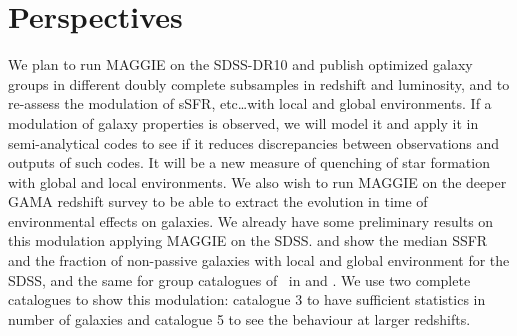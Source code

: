 \section{Perspectives}
\label{sec:perspectives}

We plan to run MAGGIE on the SDSS-DR10 and publish optimized galaxy groups in
different doubly complete subsamples in redshift and luminosity, and to
re-assess the modulation of sSFR, etc\ldots with local and global environments.
If a modulation of galaxy properties is observed, we will model it and apply it
in semi-analytical codes to see if it reduces discrepancies between
observations and outputs of such codes. It will be a new measure of quenching
of star formation with global and local environments. We also wish to run
MAGGIE on the deeper GAMA redshift survey to be able to extract the evolution
in time of environmental effects on galaxies. We already have some preliminary
results on this modulation applying MAGGIE on the SDSS\@.
 and  show the median
SSFR and the fraction of non-passive galaxies with local and global environment
for the SDSS, and the same for group catalogues of~\cite{Tempel+14} in
 and . We
use two complete catalogues to show this modulation: catalogue 3 to have
sufficient statistics in number of galaxies and catalogue 5 to see the
behaviour at larger redshifts.

